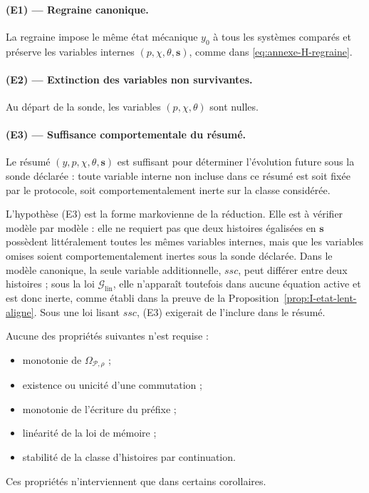 \paragraph{(E1) --- Regraine canonique.}
La regraine impose le même état mécanique $y_0$ à tous les systèmes
comparés et préserve les variables internes $(p,\chi,\theta,\mathbf s)$,
comme dans \eqref{eq:annexe-H-regraine}.

\paragraph{(E2) --- Extinction des variables non survivantes.}
Au départ de la sonde, les variables $(p,\chi,\theta)$ sont nulles.

\paragraph{(E3) --- Suffisance comportementale du résumé.}
Le résumé $(y,p,\chi,\theta,\mathbf s)$ est suffisant pour déterminer
l'évolution future sous la sonde déclarée : toute variable interne non
incluse dans ce résumé est soit fixée par le protocole, soit
comportementalement inerte sur la classe considérée.

L'hypothèse (E3) est la forme markovienne de la réduction. Elle est à
vérifier modèle par modèle : elle ne requiert pas que deux histoires
égalisées en $\mathbf s$ possèdent littéralement toutes les mêmes
variables internes, mais que les variables omises soient
comportementalement inertes sous la sonde déclarée. Dans le modèle
canonique, la seule variable additionnelle, $ssc$, peut différer entre
deux histoires ; sous la loi $\mathcal G_{\mathrm{lin}}$, elle
n'apparaît toutefois dans aucune équation active et est donc inerte,
comme établi dans la preuve de la Proposition~\ref{prop:I-etat-lent-aligne}. Sous une
loi lisant $ssc$, (E3) exigerait de l'inclure dans le résumé.

\begin{encadre}[title={Ce que le théorème ne suppose pas}]
Aucune des propriétés suivantes n'est requise :
\begin{itemize}
\item monotonie de $\Omega_{\mathcal P,\rho}$ ;
\item existence ou unicité d'une commutation ;
\item monotonie de l'écriture du préfixe ;
\item linéarité de la loi de mémoire ;
\item stabilité de la classe d'histoires par continuation.
\end{itemize}
Ces propriétés n'interviennent que dans certains corollaires.
\end{encadre}

